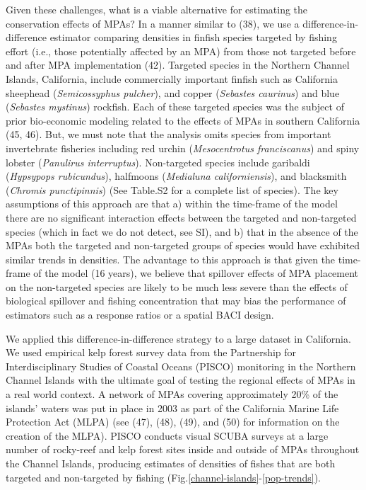 \documentclass[9pt,twocolumn,twoside,lineno]{pnas-new}
\begin{document}
Given these challenges, what is a viable alternative for estimating the
conservation effects of MPAs? In a manner similar to (38), we use a
difference-in-difference estimator comparing densities in finfish
species targeted by fishing effort (i.e., those potentially affected by
an MPA) from those not targeted before and after MPA implementation
(42). Targeted species in the Northern Channel Islands, California,
include commercially important finfish such as California sheephead
(\emph{Semicossyphus pulcher}), and copper (\emph{Sebastes caurinus})
and blue (\emph{Sebastes mystinus}) rockfish. Each of these targeted
species was the subject of prior bio-economic modeling related to the
effects of MPAs in southern California (45, 46). But, we must note that
the analysis omits species from important invertebrate fisheries
including red urchin (\emph{Mesocentrotus franciscanus}) and spiny
lobster (\emph{Panulirus interruptus}). Non-targeted species include
garibaldi (\emph{Hypsypops rubicundus}), halfmoons (\emph{Medialuna
californiensis}), and blacksmith (\emph{Chromis punctipinnis}) (See
Table.S2 for a complete list of species). The key assumptions of this
approach are that a) within the time-frame of the model there are no
significant interaction effects between the targeted and non-targeted
species (which in fact we do not detect, see SI), and b) that in the
absence of the MPAs both the targeted and non-targeted groups of species
would have exhibited similar trends in densities. The advantage to this
approach is that given the time-frame of the model (16 years), we
believe that spillover effects of MPA placement on the non-targeted
species are likely to be much less severe than the effects of biological
spillover and fishing concentration that may bias the performance of
estimators such as a response ratios or a spatial BACI design.

We applied this difference-in-difference strategy to a large dataset in
California. We used empirical kelp forest survey data from the
Partnership for Interdisciplinary Studies of Coastal Oceans (PISCO)
monitoring in the Northern Channel Islands with the ultimate goal of
testing the regional effects of MPAs in a real world context. A network
of MPAs covering approximately 20\% of the islands' waters was put in
place in 2003 as part of the California Marine Life Protection Act
(MLPA) (see (47), (48), (49), and (50) for information on the creation
of the MLPA). PISCO conducts visual SCUBA surveys at a large number of
rocky-reef and kelp forest sites inside and outside of MPAs throughout
the Channel Islands, producing estimates of densities of fishes that are
both targeted and non-targeted by fishing
(Fig.\ref{channel-islands}-\ref{pop-trends}).
\end{document}
